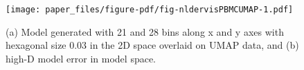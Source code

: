 \documentclass[
  12pt]{article}
\begin{document}
\begin{figure}[H]

{\centering \texttt{[image: paper\_files/figure-pdf/fig-nldervisPBMCUMAP-1.pdf]}

}

\caption{\label{fig-nldervisPBMCUMAP}(a) Model generated with 21 and 28
bins along x and y axes with hexagonal size 0.03 in the 2D space
overlaid on UMAP data, and (b) high-D model error in model space.}

\end{figure}

\begin{figure}[H]

\begin{minipage}[t]{0.33\linewidth}

{\centering 


}

\subcaption{\label{fig-pbmc1_sc1}}
\end{minipage}%
%
\begin{minipage}[t]{0.33\linewidth}

{\centering 

\raisebox{-\height}{

}}
\end{minipage}
\end{figure}
\end{document}
